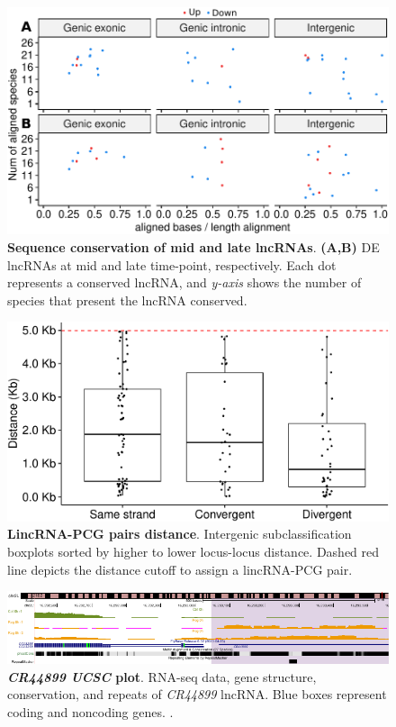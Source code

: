 \begin{figure}[ht!]
  \centering
  \includegraphics[scale=0.65]{plots/appendix/dme/seq.conservation.mid.late.pdf}
  \caption[Sequence conservation of mid and late lncRNAs]{\textbf{Sequence conservation of mid and late lncRNAs}. \textbf{(A,B)} DE lncRNAs at mid and late time-point, respectively.  Each dot represents a conserved lncRNA, and \textit{y-axis} shows the number of species that present the lncRNA conserved.}
  \label{supp-fig:lncRNA-seq-conservation}
\end{figure}

\begin{figure}[ht!]
  \centering
  \includegraphics[scale=0.6]{plots/appendix/dme/linc.PCG.distance.pdf}
  \caption[LincRNA-PCG pairs distance]{\textbf{LincRNA-PCG pairs distance}. Intergenic subclassification boxplots sorted by higher to lower locus-locus distance. Dashed red line depicts the distance cutoff to assign a lincRNA-PCG pair.}
  \label{supp-fig:lincRNA-distance}
\end{figure}


\begin{figure}[ht!]
  \centering
  \includegraphics[width=1\textwidth]{plots/appendix/dme/cr44899.ucsc.plot.pdf}
  \caption[\textit{CR44899 UCSC} plot]{\textbf{\textit{CR44899 UCSC} plot}. RNA-seq data, gene structure, conservation, and repeats of \textit{CR44899} lncRNA. Blue boxes represent coding and noncoding genes. .}
  \label{supp-fig:cr43611-ucsc}
\end{figure}

